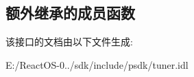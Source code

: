 \subsection*{额外继承的成员函数}


该接口的文档由以下文件生成\+:\begin{DoxyCompactItemize}
\item 
E\+:/\+React\+O\+S-\/0../sdk/include/psdk/tuner.\+idl\end{DoxyCompactItemize}
